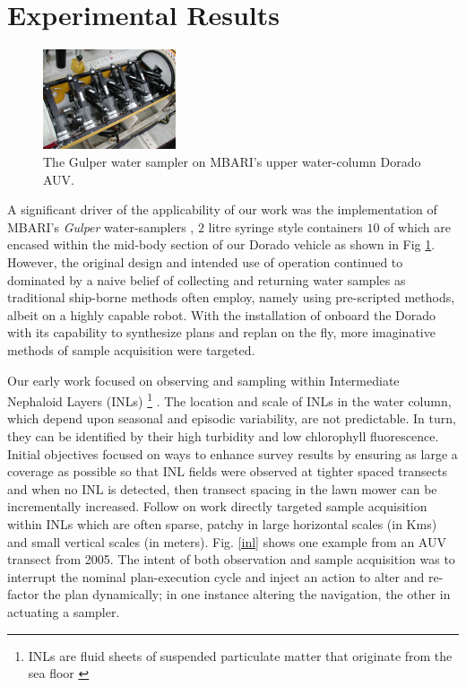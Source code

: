 \section{Experimental Results}
\label{sec:results}



\begin{figure}[htpb]
\centering
\includegraphics[width=0.35\textwidth]{figs/gulper.jpg}
\caption{\small{The Gulper water sampler \cite{Bird07} on MBARI's
    upper water-column Dorado AUV.}}
\label{fig:gulper}
\end{figure}

A significant driver of the applicability of our work was the
implementation of MBARI's \emph{Gulper} water-samplers \cite{Bird07},
$2$ litre syringe style containers $10$ of which are encased within
the mid-body section of our Dorado vehicle as shown in Fig
\ref{fig:gulper}. However, the original design and intended use of
operation continued to dominated by a naive belief of collecting and
returning water samples as traditional ship-borne methods often
employ, namely using pre-scripted methods, albeit on a highly capable
robot. With the installation of \rx onboard the Dorado with its
capability to synthesize plans and replan on the fly, more imaginative
methods of sample acquisition were targeted.

Our early work focused on observing and sampling within Intermediate
Nephaloid Layers (INLs) \footnote{INLs are fluid sheets of suspended
  particulate matter that originate from the sea floor
  \cite{mcphee-shaw2006}} \cite{ryan10}. The location and scale of
INLs in the water column, which depend upon seasonal and episodic
variability, are not predictable. In turn, they can be identified by
their high turbidity and low chlorophyll fluorescence. Initial
objectives focused on ways to enhance survey results by ensuring as
large a coverage as possible so that INL fields were observed at
tighter spaced transects and when no INL is detected, then transect
spacing in the lawn mower can be incrementally increased. Follow on
work directly targeted sample acquisition within INLs which are often
sparse, patchy in large horizontal scales (in Kms) and small vertical
scales (in meters). Fig. \ref{inl} shows one example from an AUV
transect from 2005. The intent of both observation and sample
acquisition was to interrupt the nominal plan-execution cycle and
inject an action to alter and re-factor the plan dynamically; in one
instance altering the navigation, the other in actuating a sampler.


